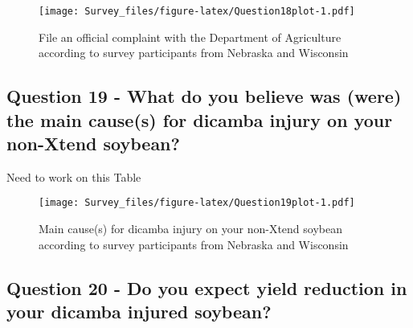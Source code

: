 \documentclass[]{article}
\begin{document}
\begin{figure}
\centering
\texttt{[image: Survey\_files/figure-latex/Question18plot-1.pdf]}
\caption{File an official complaint with the Department of Agriculture
according to survey participants from Nebraska and Wisconsin}
\end{figure}

\newpage

\subsection{Question 19 - What do you believe was (were) the main
cause(s) for dicamba injury on your non-Xtend
soybean?}\label{question-19---what-do-you-believe-was-were-the-main-causes-for-dicamba-injury-on-your-non-xtend-soybean}

Need to work on this Table

\newpage

\begin{figure}
\centering
\texttt{[image: Survey\_files/figure-latex/Question19plot-1.pdf]}
\caption{Main cause(s) for dicamba injury on your non-Xtend soybean
according to survey participants from Nebraska and Wisconsin}
\end{figure}

\newpage

\subsection{Question 20 - Do you expect yield reduction in your dicamba
injured
soybean?}\label{question-20---do-you-expect-yield-reduction-in-your-dicamba-injured-soybean}
\end{document}
